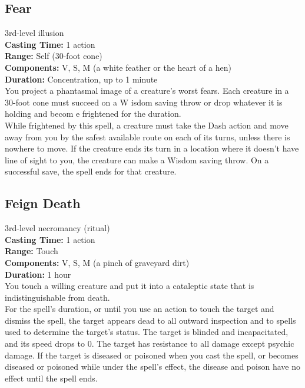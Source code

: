 \documentclass[11pt, A4paper, english]{article}
\begin{document}
		\subsection{Fear}
3rd-level illusion \\
\textbf{Casting Time:} 1 action \\
\textbf{Range:} Self (30-foot cone) \\
\textbf{Components:} V, S, M (a white feather or the heart of a hen) \\
\textbf{Duration:} Concentration, up to 1 minute \\
You project a phantasmal image of a creature’s worst fears. Each creature in a 30-foot cone must succeed on a W isdom saving throw or drop whatever it is holding and becom e frightened for the duration. \\
While frightened by this spell, a creature must take the Dash action and move away from you by the safest available route on each of its turns, unless there is nowhere to move. If the creature ends its turn in a location where it doesn’t have line of sight to you, the creature can make a Wisdom saving throw. On a successful save, the spell ends for that creature.

		\subsection{Feign Death}
3rd-level necromancy (ritual) \\
\textbf{Casting Time:} 1 action \\
\textbf{Range:} Touch \\
\textbf{Components:} V, S, M (a pinch of graveyard dirt) \\
\textbf{Duration:} 1 hour \\
You touch a willing creature and put it into a cataleptic state that is indistinguishable from death. \\
For the spell’s duration, or until you use an action to touch the target and dismiss the spell, the target appears dead to all outward inspection and to spells used to determine the target’s status. The target is blinded and incapacitated, and its speed drops to 0. The target has resistance to all damage except psychic damage. If the target is diseased or poisoned when you cast the spell, or becomes diseased or poisoned while under the spell’s effect, the disease and poison have no effect until the spell ends.
\end{document}
